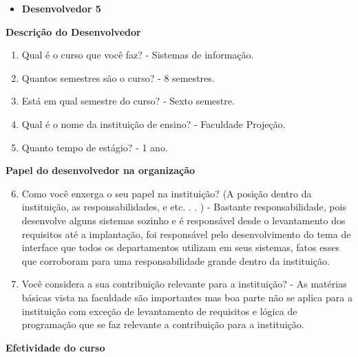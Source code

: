 \begin{anexosenv}


\begin{itemize}
\item \textbf{Desenvolvedor 5}
\end{itemize}

\textbf{Descrição do Desenvolvedor}

\begin{enumerate}
\item Qual é o curso que você faz?\newline
- Sistemas de informação.
\item Quantos semestres são o curso?\newline
- 8 semestres.
\item Está em qual semestre do curso?\newline
- Sexto semestre.
\item Qual é o nome da instituição de ensino?\newline
- Faculdade Projeção.
\item Quanto tempo de estágio?\newline
- 1 ano.
\end{enumerate}

\textbf{Papel do desenvolvedor na organização}

\begin{enumerate}
\setcounter{enumi}{5}
\item Como você enxerga o seu papel na instituição? (A posição dentro da instituição, as
responsabilidades, e etc. . . )\newline
-  Bastante responsabilidade, pois desenvolve alguns sistemas sozinho e é responsável desde o levantamento dos requisitos até a implantação, foi responsável pelo desenvolvimento do tema de interface que todos os departamentos utilizam em seus sistemas, fatos esses que corroboram para uma responsabilidade grande dentro da instituição.
\item Você considera a sua contribuição relevante para a instituição?\newline
- As matérias básicas vista na faculdade são importantes mas boa parte não se aplica para a instituição com exceção de levantamento de requisitos e lógica de programação que se faz relevante a contribuição para a instituição.
\end{enumerate}

\textbf{Efetividade do curso}


\end{anexosenv}

